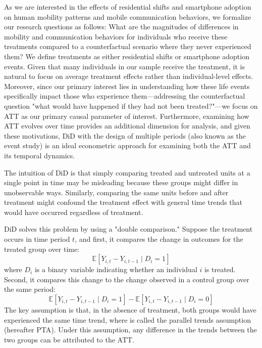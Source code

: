 
As we are interested in the effects of residential shifts and smartphone adoption on human mobility patterns and mobile communication behaviors, we formalize our research questions as follows: What are the magnitudes of differences in mobility and communication behaviors for individuals who receive these treatments compared to a counterfactual scenario where they never experienced them?
We define treatments as either residential shifts or smartphone adoption events. Given that many individuals in our sample receive the treatment, it is natural to focus on average treatment effects rather than individual-level effects. Moreover, since our primary interest lies in understanding how these life events specifically impact those who experience them---addressing the counterfactual question "what would have happened if they had not been treated?"---we focus on ATT as our primary causal parameter of interest.
Furthermore, examining how ATT evolves over time provides an additional dimension for analysis, and given these motivations, DiD with the design of multiple periods (also known as the event study) is an ideal econometric approach for examining both the ATT and its temporal dynamics.


The intuition of DiD is that simply comparing treated and untreated units at a single point in time may be misleading because these groups might differ in unobservable ways. Similarly, comparing the same units before and after treatment might confound the treatment effect with general time trends that would have occurred regardless of treatment.

DiD solves this problem by using a "double comparison." Suppose the treatment occurs in time period \( t \), and first, it compares the change in outcomes for the treated group over time:
\[
\mathbb{E}[Y_{i, t} - Y_{i, t-1} \mid D_i = 1]
\]
where \( D_i \) is a binary variable indicating whether an individual \( i \) is treated. Second, it compares this change to the change observed in a control group over the same period:
\[
\mathbb{E}[Y_{i, t} - Y_{i, t-1} \mid D_i = 1]
-
\mathbb{E}[Y_{i, t} - Y_{i, t-1} \mid D_i = 0]
\]
The key assumption is that, in the absence of treatment, both groups would have experienced the same time trend, where is called the parallel trends assumption (hereafter PTA).
Under this assumption, any difference in the trends between the two groups can be attributed to the ATT.

